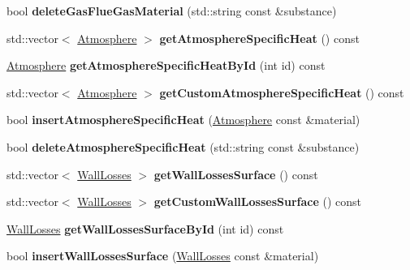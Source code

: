\begin{DoxyCompactItemize}
bool {\bfseries delete\+Gas\+Flue\+Gas\+Material} (std\+::string const \&substance)
\item 
\mbox{\label{class_s_q_lite_ab3519768b6490be3ea5c57df3a4ad3a4}} 
std\+::vector$<$ \hyperlink{class_atmosphere}{Atmosphere} $>$ {\bfseries get\+Atmosphere\+Specific\+Heat} () const
\item 
\mbox{\label{class_s_q_lite_ae468835cffed182bb9819299463c53b7}} 
\hyperlink{class_atmosphere}{Atmosphere} {\bfseries get\+Atmosphere\+Specific\+Heat\+By\+Id} (int id) const
\item 
\mbox{\label{class_s_q_lite_a93535b59e35ada6a194601e36c0055f1}} 
std\+::vector$<$ \hyperlink{class_atmosphere}{Atmosphere} $>$ {\bfseries get\+Custom\+Atmosphere\+Specific\+Heat} () const
\item 
\mbox{\label{class_s_q_lite_a5be90371486d63abd80668c19682051b}} 
bool {\bfseries insert\+Atmosphere\+Specific\+Heat} (\hyperlink{class_atmosphere}{Atmosphere} const \&material)
\item 
\mbox{\label{class_s_q_lite_a5ad78a89bad17d0e23b59a9c018590f9}} 
bool {\bfseries delete\+Atmosphere\+Specific\+Heat} (std\+::string const \&substance)
\item 
\mbox{\label{class_s_q_lite_a612950dca9d08332a31a020783ba832d}} 
std\+::vector$<$ \hyperlink{class_wall_losses}{Wall\+Losses} $>$ {\bfseries get\+Wall\+Losses\+Surface} () const
\item 
\mbox{\label{class_s_q_lite_a0314139eab40caf617a2e8e465ba3913}} 
std\+::vector$<$ \hyperlink{class_wall_losses}{Wall\+Losses} $>$ {\bfseries get\+Custom\+Wall\+Losses\+Surface} () const
\item 
\mbox{\label{class_s_q_lite_a3a7f473d8e23630dae65cd3c3dd7fa97}} 
\hyperlink{class_wall_losses}{Wall\+Losses} {\bfseries get\+Wall\+Losses\+Surface\+By\+Id} (int id) const
\item 
\mbox{\label{class_s_q_lite_a97d510f6f16aa70c61a9dc6a629ad786}} 
bool {\bfseries insert\+Wall\+Losses\+Surface} (\hyperlink{class_wall_losses}{Wall\+Losses} const \&material)

\end{DoxyCompactItemize}
